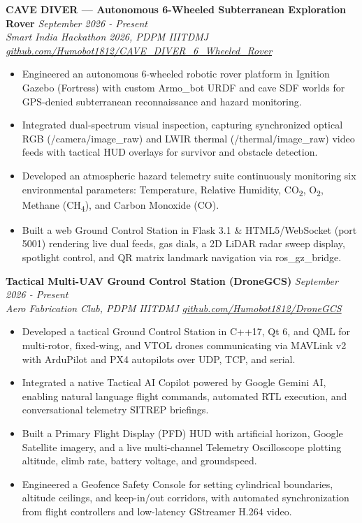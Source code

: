 \documentclass[10pt,a4paper]{article}
\begin{document}
\vspace{3pt}
\textbf{CAVE DIVER — Autonomous 6-Wheeled Subterranean Exploration Rover} \hfill \textit{September 2026 - Present}\\
\textit{Smart India Hackathon 2026, PDPM IIITDMJ} \hfill \textit{\href{https://github.com/Humobot1812/CAVE_DIVER_6_Wheeled_Rover}{github.com/Humobot1812/CAVE\_DIVER\_6\_Wheeled\_Rover}}
\begin{itemize}[leftmargin=1.2rem,itemsep=1.5pt,topsep=2pt,parsep=0pt]
  \item Engineered an autonomous 6-wheeled robotic rover platform in Ignition Gazebo (Fortress) with custom Armo\_bot URDF and cave SDF worlds for GPS-denied subterranean reconnaissance and hazard monitoring.
  \item Integrated dual-spectrum visual inspection, capturing synchronized optical RGB (/camera/image\_raw) and LWIR thermal (/thermal/image\_raw) video feeds with tactical HUD overlays for survivor and obstacle detection.
  \item Developed an atmospheric hazard telemetry suite continuously monitoring six environmental parameters: Temperature, Relative Humidity, CO\textsubscript{2}, O\textsubscript{2}, Methane (CH\textsubscript{4}), and Carbon Monoxide (CO).
  \item Built a web Ground Control Station in Flask 3.1 \& HTML5/WebSocket (port 5001) rendering live dual feeds, gas dials, a 2D LiDAR radar sweep display, spotlight control, and QR matrix landmark navigation via ros\_gz\_bridge.
\end{itemize}

\vspace{3pt}
\textbf{Tactical Multi-UAV Ground Control Station (DroneGCS)} \hfill \textit{September 2026 - Present}\\
\textit{Aero Fabrication Club, PDPM IIITDMJ} \hfill \textit{\href{https://github.com/Humobot1812/DroneGCS}{github.com/Humobot1812/DroneGCS}}
\begin{itemize}[leftmargin=1.2rem,itemsep=1.5pt,topsep=2pt,parsep=0pt]
  \item Developed a tactical Ground Control Station in C++17, Qt 6, and QML for multi-rotor, fixed-wing, and VTOL drones communicating via MAVLink v2 with ArduPilot and PX4 autopilots over UDP, TCP, and serial.
  \item Integrated a native Tactical AI Copilot powered by Google Gemini AI, enabling natural language flight commands, automated RTL execution, and conversational telemetry SITREP briefings.
  \item Built a Primary Flight Display (PFD) HUD with artificial horizon, Google Satellite imagery, and a live multi-channel Telemetry Oscilloscope plotting altitude, climb rate, battery voltage, and groundspeed.
  \item Engineered a Geofence Safety Console for setting cylindrical boundaries, altitude ceilings, and keep-in/out corridors, with automated synchronization from flight controllers and low-latency GStreamer H.264 video.
\end{itemize}
\end{document}
